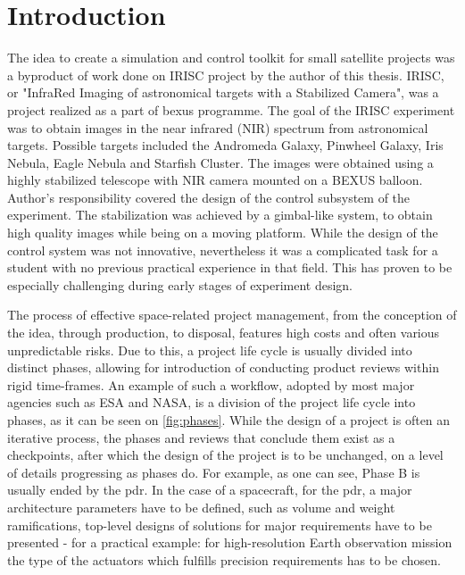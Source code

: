 \section{Introduction}\label{sec:introduction}
    The idea to create a simulation and control toolkit for small satellite projects was a byproduct of work done on IRISC project by the author of this thesis. IRISC, or "InfraRed Imaging of astronomical targets with a Stabilized Camera", was a project realized as a part of \ac{bexus} programme. The goal of the IRISC experiment was to obtain images in the near infrared (NIR) spectrum from astronomical targets. Possible targets included the Andromeda Galaxy, Pinwheel Galaxy, Iris Nebula, Eagle Nebula and Starfish Cluster. The images were obtained using a highly stabilized telescope with NIR camera mounted on a BEXUS balloon. Author's responsibility covered the design of the control subsystem of the experiment. The stabilization was achieved by a gimbal-like system, to obtain high quality images while being on a moving platform. \cite{irisc-sed} While the design of the control system was not innovative, nevertheless it was a complicated task for a student with no previous practical experience in that field. This has proven to be especially challenging during early stages of experiment design.

    The process of effective space-related project management, from the conception of the idea, through production, to disposal, features high costs and often various unpredictable risks. Due to this, a project life cycle is usually divided into distinct phases, allowing for introduction of conducting product reviews within rigid time-frames. An example of such a workflow, adopted by most major agencies such as ESA\cite{managementecss} and NASA\cite{kapurch2010nasa}, is a division of the project life cycle into phases, as it can be seen on \autoref{fig:phases}. While the design of a project is often an iterative process, the phases and reviews that conclude them exist as a checkpoints, after which the design of the project is to be unchanged, on a level of details progressing as phases do. For example, as one can see, Phase B is usually ended by the \ac{pdr}. In the case of a spacecraft, for the \ac{pdr}, a major architecture parameters have to be defined, such as volume and weight ramifications, top-level designs of solutions for major requirements have to be presented - for a practical example: for high-resolution Earth observation mission the type of the actuators which fulfills precision requirements has to be chosen.

